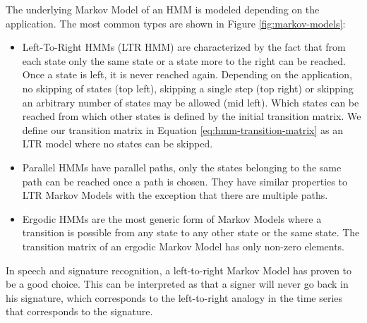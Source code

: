 \documentclass[a4paper, oneside]{csthesis}
\begin{document}
The underlying Markov Model of an HMM is modeled depending on the application. The most common types are shown in Figure \ref{fig:markov-models}:
\begin{itemize}
\item Left-To-Right HMMs (LTR HMM) are characterized by the fact that from each state only the same state or a state more to the right can be reached. Once a state is left, it is never reached again. Depending on the application, no skipping of states (top left), skipping a single step (top right) or skipping an arbitrary number of states may be allowed (mid left). Which states can be reached from which other states is defined by the initial transition matrix. We define our transition matrix in Equation \ref{eq:hmm-transition-matrix} as an LTR model where no states can be skipped.
\item Parallel HMMs have parallel paths, only the states belonging to the same path can be reached once a path is chosen. They have similar properties to LTR Markov Models with the exception that there are multiple paths.
\item Ergodic HMMs are the most generic form of Markov Models where a transition is possible from any state to any other state or the same state. The transition matrix of an ergodic Markov Model has only non-zero elements.
\end{itemize}

In speech and signature recognition, a left-to-right Markov Model has proven to be a good choice. This can be interpreted as that a signer will never go back in his signature, which corresponds to the left-to-right analogy in the time series that corresponds to the signature.
\end{document}
